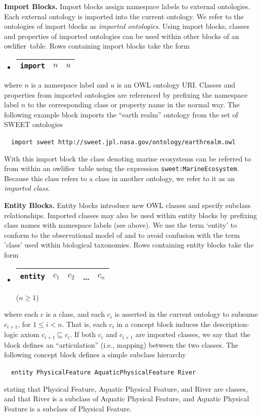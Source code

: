 \documentclass[preprint,number]{elsarticle}
\newcommand{\owlifier}{\textsf{owlifier}}
\newcommand{\myblock}[1]{\vspace{12pt}\noindent\textbf{#1}}
\begin{document}
\myblock{Import Blocks.} Import blocks assign namespace labels to
external ontologies. Each external ontology is imported into the
current ontology. We refer to the ontologies of import blocks as
\emph{imported ontologies}.  Using import blocks, classes and
properties of imported ontologies can be used within other blocks of
an \owlifier\ table.  Rows containing import blocks take the form
\begin{itemize}
\item[]
  \begin{tabular}{|l|l|l|}\hline
    \texttt{import} & $n$ & $u$ \\ \hline 
  \end{tabular} 
\end{itemize}
where $n$ is a namespace label and $u$ is an OWL ontology URI. Classes
and properties from imported ontologies are referenced by prefixing
the namespace label $n$ to the corresponding class or property name in
the normal way. The following example block imports the ``earth
realm'' ontology from the set of SWEET ontologies
\cite{raskin:_seman_web_for_earth_and}
\begin{tabbing}
  ~~\texttt{import sweet
    http://sweet.jpl.nasa.gov/ontology/earthrealm.owl}
\end{tabbing}
With this import block the class denoting marine ecosystems can be
referred to from within an \owlifier\ table using the expression
\texttt{sweet:MarineEcosystem}. Because this class refers to a class
in another ontology, we refer to it as an \emph{imported class}.


\myblock{Entity Blocks.} Entity blocks introduce new OWL classes and
specify subclass relationships. Imported classes may also be used
within entity blocks by prefixing class names with namespace labels
(see above).  We use the term `entity' to conform to the observational
model of \cite{bowers08:_concep_model_framew_for_expres} and to avoid
confusion with the term 'class' used within biological
taxonomies. Rows containing entity blocks take the form
\begin{itemize}
\item[] 
  \begin{tabular}{|l|l|l|l|l|}\hline
    \texttt{entity} & $c_1$ & $c_2$ & \dots & $c_n$ \\ \hline 
  \end{tabular} \hfill ($n \ge 1$)
\end{itemize}
where each $c$ is a class, and each $c_i$ is asserted in the current
ontology to subsume $c_{i+1}$, for $1 \le i < n$. That is, each $c_i$
in a concept block induces the description-logic axiom $c_{i+1}
\sqsubseteq c_i$.  If both $c_i$ and $c_{i+1}$ are imported classes,
we say that the block defines an ``articulation'' (i.e., mapping)
between the two classes. The following concept block defines a simple
subclass hierarchy
\begin{tabbing}
  ~~\texttt{entity PhysicalFeature AquaticPhysicalFeature River}
\end{tabbing}
stating that Physical Feature, Aquatic Physical Feature, and River are
classes, and that River is a subclass of Aquatic Physical Feature, and
Aquatic Physical Feature is a subclass of Physical Feature.
\end{document}
